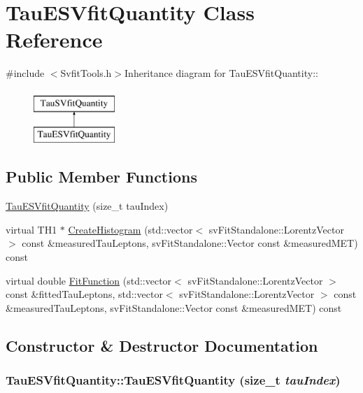 \hypertarget{classTauESVfitQuantity}{
\section{TauESVfitQuantity Class Reference}
\label{classTauESVfitQuantity}
}


{\ttfamily \#include $<$SvfitTools.h$>$}Inheritance diagram for TauESVfitQuantity::\begin{figure}[H]
\begin{center}
\leavevmode
\includegraphics[height=2cm]{classTauESVfitQuantity}
\end{center}
\end{figure}
\subsection*{Public Member Functions}
\begin{DoxyCompactItemize}
\item 
\hyperlink{classTauESVfitQuantity_a2aae1f74452c08dcae759721dfe30760}{TauESVfitQuantity} (size\_\-t tauIndex)
\item 
virtual TH1 $\ast$ \hyperlink{classTauESVfitQuantity_aa16a2c9b7e9c139df0048ea6e4fbd0aa}{CreateHistogram} (std::vector$<$ svFitStandalone::LorentzVector $>$ const \&measuredTauLeptons, svFitStandalone::Vector const \&measuredMET) const 
\item 
virtual double \hyperlink{classTauESVfitQuantity_a6eb4d1ec1a95938a2bf038cb137cac94}{FitFunction} (std::vector$<$ svFitStandalone::LorentzVector $>$ const \&fittedTauLeptons, std::vector$<$ svFitStandalone::LorentzVector $>$ const \&measuredTauLeptons, svFitStandalone::Vector const \&measuredMET) const 
\end{DoxyCompactItemize}


\subsection{Constructor \& Destructor Documentation}
\hypertarget{classTauESVfitQuantity_a2aae1f74452c08dcae759721dfe30760}{
\subsubsection[{TauESVfitQuantity}]{\setlength{\rightskip}{0pt plus 5cm}TauESVfitQuantity::TauESVfitQuantity (size\_\-t {\em tauIndex})}}
\label{classTauESVfitQuantity_a2aae1f74452c08dcae759721dfe30760}


